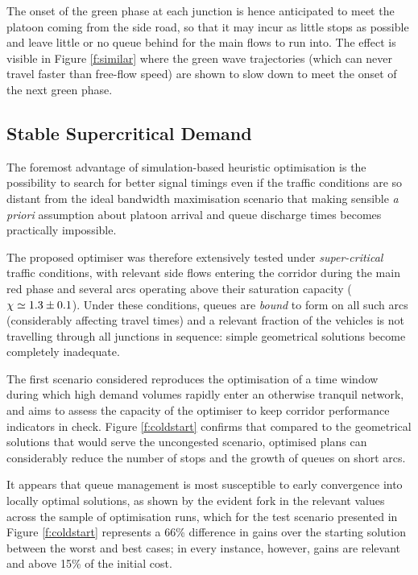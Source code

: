 The onset of the green phase at each junction is hence anticipated to meet the platoon coming from the side road, so that it may incur as little stops as possible and leave little or no queue behind for the main flows to run into. The effect is visible in Figure \ref{f:similar} where the green wave trajectories (which can never travel faster than free-flow speed) are shown to slow down to meet the onset of the next green phase.


\subsection{Stable Supercritical Demand}
The foremost advantage of simulation-based heuristic optimisation is the possibility to search for better signal timings even if the traffic conditions are so distant from the ideal bandwidth maximisation scenario that making sensible \emph{a priori} assumption about platoon arrival and queue discharge times becomes practically impossible.

The proposed optimiser was therefore extensively tested under \emph{super-critical} traffic conditions, with relevant side flows entering the corridor during the main red phase and several arcs operating above their saturation capacity ($\chi \simeq 1.3 \pm 0.1$). Under these conditions, queues are \emph{bound} to form on all such arcs (considerably affecting travel times) and a relevant fraction of the vehicles is not travelling through all junctions in sequence: simple geometrical solutions become completely inadequate.

The first scenario considered reproduces the optimisation of a time window during which high demand volumes rapidly enter an otherwise tranquil network, and aims to assess the capacity of the optimiser to keep corridor performance indicators in check. Figure \ref{f:coldstart} confirms that compared to the geometrical solutions that would serve the uncongested scenario, optimised plans can considerably reduce the number of stops and the growth of queues on short arcs. 


It appears that queue management is most susceptible to early convergence into locally optimal solutions, as shown by the evident fork in the relevant values across the sample of optimisation runs, which for the test scenario presented in Figure \ref{f:coldstart} represents a 66\% difference in gains over the starting solution between the worst and best cases; in every instance, however, gains are relevant and above 15\% of the initial cost. 

